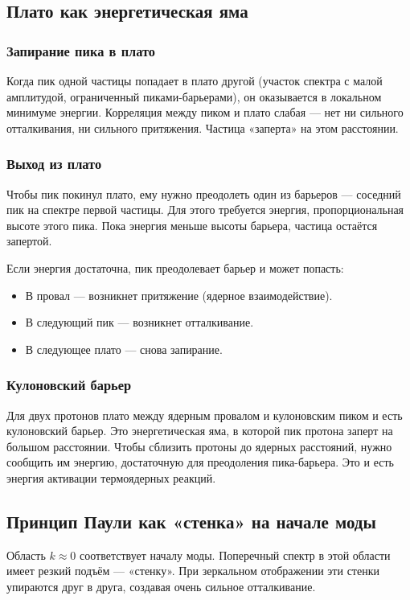 \documentclass[12pt,a4paper]{article}
\begin{document}
\subsection{Плато как энергетическая яма}

\subsubsection{Запирание пика в плато}
Когда пик одной частицы попадает в плато другой (участок спектра с малой амплитудой, ограниченный пиками-барьерами), он оказывается в локальном минимуме энергии. Корреляция между пиком и плато слабая --- нет ни сильного отталкивания, ни сильного притяжения. Частица «заперта» на этом расстоянии.

\subsubsection{Выход из плато}
Чтобы пик покинул плато, ему нужно преодолеть один из барьеров --- соседний пик на спектре первой частицы. Для этого требуется энергия, пропорциональная высоте этого пика. Пока энергия меньше высоты барьера, частица остаётся запертой.

Если энергия достаточна, пик преодолевает барьер и может попасть:
\begin{itemize}
    \item В провал --- возникнет притяжение (ядерное взаимодействие).
    \item В следующий пик --- возникнет отталкивание.
    \item В следующее плато --- снова запирание.
\end{itemize}

\subsubsection{Кулоновский барьер}
Для двух протонов плато между ядерным провалом и кулоновским пиком и есть кулоновский барьер. Это энергетическая яма, в которой пик протона заперт на большом расстоянии. Чтобы сблизить протоны до ядерных расстояний, нужно сообщить им энергию, достаточную для преодоления пика-барьера. Это и есть энергия активации термоядерных реакций.

\subsection{Принцип Паули как «стенка» на начале моды}
Область $k \approx 0$ соответствует началу моды. Поперечный спектр в этой области имеет резкий подъём --- «стенку». При зеркальном отображении эти стенки упираются друг в друга, создавая очень сильное отталкивание.
\end{document}
